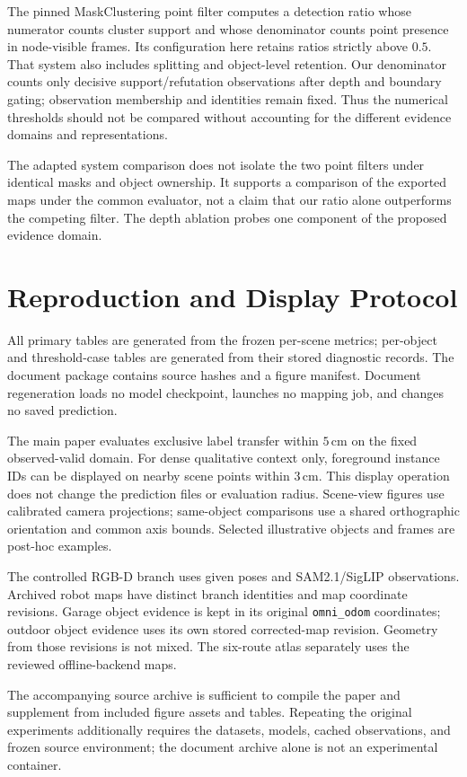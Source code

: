 The pinned MaskClustering point filter computes a detection ratio whose numerator counts cluster support and whose denominator counts point presence in node-visible frames. Its configuration here retains ratios strictly above $0.5$. That system also includes splitting and object-level retention. Our denominator counts only decisive support/refutation observations after depth and boundary gating; observation membership and identities remain fixed. Thus the numerical thresholds should not be compared without accounting for the different evidence domains and representations.

The adapted system comparison does not isolate the two point filters under identical masks and object ownership. It supports a comparison of the exported maps under the common evaluator, not a claim that our ratio alone outperforms the competing filter. The depth ablation probes one component of the proposed evidence domain.

\section{Reproduction and Display Protocol}
All primary tables are generated from the frozen per-scene metrics; per-object and threshold-case tables are generated from their stored diagnostic records. The document package contains source hashes and a figure manifest. Document regeneration loads no model checkpoint, launches no mapping job, and changes no saved prediction.

The main paper evaluates exclusive label transfer within $5\,\mathrm{cm}$ on the fixed observed-valid domain. For dense qualitative context only, foreground instance IDs can be displayed on nearby scene points within $3\,\mathrm{cm}$. This display operation does not change the prediction files or evaluation radius. Scene-view figures use calibrated camera projections; same-object comparisons use a shared orthographic orientation and common axis bounds. Selected illustrative objects and frames are post-hoc examples.

The controlled RGB-D branch uses given poses and SAM2.1/SigLIP observations. Archived robot maps have distinct branch identities and map coordinate revisions. Garage object evidence is kept in its original \texttt{omni\_odom} coordinates; outdoor object evidence uses its own stored corrected-map revision. Geometry from those revisions is not mixed. The six-route atlas separately uses the reviewed offline-backend maps.

The accompanying source archive is sufficient to compile the paper and supplement from included figure assets and tables. Repeating the original experiments additionally requires the datasets, models, cached observations, and frozen source environment; the document archive alone is not an experimental container.

